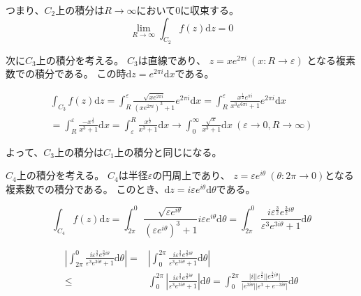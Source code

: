 \documentclass[12pt,b5paper]{ltjsarticle}
\begin{document}
つまり、$C_2$上の積分は$R\to\infty$において$0$に収束する。
\begin{equation}
 \lim_{R\to\infty}\int_{C_2} f(z)\mathrm{d}z=0
\end{equation}

次に$C_3$上の積分を考える。
$C_3$は直線であり、
$z=x e^{2\pi i} \ (x:R\to\varepsilon)$
となる複素数での積分である。
この時$\mathrm{d}z=e^{2\pi i}\mathrm{d}x$である。

\begin{align}
  \int_{C_3} f(z)\mathrm{d}z
   =
  \int_{R}^{\varepsilon} \frac{\sqrt{x e^{2\pi i}}}{(x e^{2\pi i})^3+1}e^{2\pi i}\mathrm{d}x
  =
  \int_{R}^{\varepsilon} \frac{x^{\frac{1}{2}} e^{\pi i}}{x^3 e^{6\pi i}+1}e^{2\pi i}\mathrm{d}x\\
  =\int_{R}^{\varepsilon} \frac{-x^{\frac{1}{2}}}{x^3 +1}\mathrm{d}x
  =\int_{\varepsilon}^{R} \frac{x^{\frac{1}{2}}}{x^3 +1}\mathrm{d}x
 \to \int_{0}^{\infty} \frac{\sqrt{x}}{x^3 +1}\mathrm{d}x \ (\varepsilon\to 0, R\to\infty)
\end{align}

よって、$C_3$上の積分は$C_1$上の積分と同じになる。

$C_4$上の積分を考える。
$C_4$は半径$\varepsilon$の円周上であり、
$z=\varepsilon e^{i\theta} \ (\theta : 2\pi \to 0)$となる複素数での積分である。
このとき、$\mathrm{d}z = i \varepsilon e^{i\theta}\mathrm{d}\theta$である。

\begin{equation}
 \int_{C_4}f(z)\mathrm{d}z
  = \int_{2\pi}^{0} \frac{\sqrt{\varepsilon e^{i\theta}}}{(\varepsilon e^{i\theta})^3+1} i\varepsilon e^{i\theta}\mathrm{d}\theta
  = \int_{2\pi}^{0} \frac{i\varepsilon^{\frac{3}{2}}e^{\frac{3}{2}i\theta}}{\varepsilon^3 e^{3i\theta}+1} \mathrm{d}\theta
\end{equation}

\begin{align}
 \left\lvert \int_{2\pi}^{0} \frac{i\varepsilon^{\frac{3}{2}}e^{\frac{3}{2}i\theta}}{\varepsilon^3 e^{3i\theta}+1} \mathrm{d}\theta \right\rvert
  =&
  \left\lvert \int_{0}^{2\pi} \frac{i\varepsilon^{\frac{3}{2}}e^{\frac{3}{2}i\theta}}{\varepsilon^3 e^{3i\theta}+1} \mathrm{d}\theta \right\rvert\\
  \leq &
  \int_{0}^{2\pi} \left\lvert \frac{i\varepsilon^{\frac{3}{2}}e^{\frac{3}{2}i\theta}}{\varepsilon^3 e^{3i\theta}+1} \right\rvert \mathrm{d}\theta
  =
  \int_{0}^{2\pi} \frac{\lvert i \rvert \lvert \varepsilon^{\frac{3}{2}}\rvert \lvert e^{\frac{3}{2}i\theta}\rvert}{\lvert e^{3i\theta}\rvert \lvert \varepsilon^3  + e^{-3i\theta} \rvert} \mathrm{d}\theta
\end{align}
\end{document}
